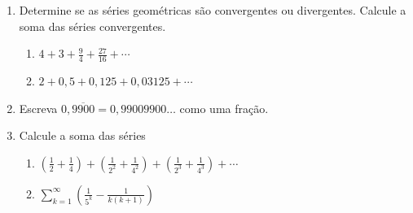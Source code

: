 \documentclass[a4paper,5pt]{amsbook}
\newcommand{\ds}{\displaystyle}
\begin{document}
\begin{enumerate}
        \noindent{}%

        \vspace{0.5cm}
    \item Determine se as s\'eries geom\'etricas s\~ao convergentes ou divergentes.
        Calcule a soma das s\'eries convergentes.
        \begin{enumerate}
                \vspace{0.3cm}
            \item $\ds4+3+\frac{9}{4}+\frac{27}{16}+\cdots$
                \vspace{0.3cm}
            \item $\ds2+0,5+0,125+0,03125+\cdots$
        \end{enumerate}

        \vspace{0.5cm}
    \item Escreva $0,\overline{9900} = 0,99009900\ldots$ como uma fra\c{c}\~ao.

        \vspace{0.5cm}
    \item Calcule a soma das s\'eries
        \begin{enumerate}
                \vspace{0.3cm}
            \item $\ds\left(\frac{1}{2}+\frac{1}{4}\right)+\left(\frac{1}{2^2}+\frac{1}{4^2}\right)+\left(\frac{1}{2^3}+\frac{1}{4^3}\right)+\cdots$
                \vspace{0.3cm}
            \item $\ds\sum_{k=1}^\infty \left(\frac{1}{5^k} - \frac{1}{k(k+1)}\right)$
        \end{enumerate}
\end{enumerate}
\end{document}
